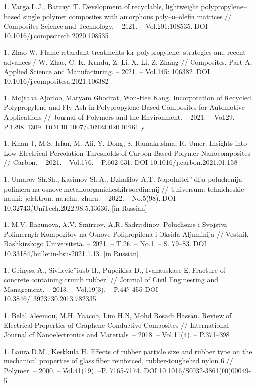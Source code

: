 1. Varga L.J., Baranyi T. Development of recyclable, lightweight
polypropylene--based single polymer composites with amorphous
poly--α--olefin matrices // Composites Science and Technology. --
2021. -- Vol.201:108535. DOI 10.1016/j.compscitech.2020.108535

1. Zhao W. Flame retardant treatments for polypropylene: strategies and
recent advances / W. Zhao, C. K. Kundu, Z. Li, X. Li, Z. Zhang //
Composites. Part A, Applied Science and Manufacturing. -- 2021. --
Vol.145: 106382. DOI 10.1016/j.compositesa.2021.106382

1. Mojtaba Ajorloo, Maryam Ghodrat, Won-Hee Kang. Incorporation of
Recycled Polypropylene and Fly Ash in Polypropylene-Based Composites
for Automotive Applications // Journal of Polymers and the
Environment. -- 2021. -- Vol.29. -- P.1298--1309. DOI
10.1007/s10924-020-01961-y

1. Khan Т, M.S. Irfan, M. Ali, Y. Dong, S. Ramakrishna, R. Umer. Insights
into Low Electrical Percolation Thresholds of Carbon-Based Polymer
Nanocomposites // Carbon. -- 2021. -- Vol.176. -- P.602-631. DOI
10.1016/j.carbon.2021.01.158

1. Umarov Sh.Sh., Kasimov Sh.A., Dzhalilov A.T.
Napolnitel''{} dlja poluchenija polimera
na osnove metalloorganicheskih soedinenij // Universum: tehnicheskie
nauki: jelektron. nauchn. zhurn. -- 2022. -- No.5(98). DOI
10.32743/UniTech.2022.98.5.13636. {[}in Russian{]}

1. M.V. Bazunova, A.V. Smirnov, A.R. Sadritdinov. Poluchenie i Svojstva
Polimernyh Kompozitov na Osnove Polipropilena i Oksida Aljuminija //
Vestnik Bashkirskogo Universiteta. -- 2021. -- T.26. -- No.1. -- S.
79--83. DOI 10.33184/bulletin-bsu-2021.1.13. {[}in Russian{]}

1. Grinysa А., Sivilevicˇiusb H., Pupeikisa D., Ivanauskasc Е. Fracture
of concrete containing crumb rubber. // Journal of Civil Engineering
and Management. -- 2013. -- Vol.19(3). -- Р.447-455 DOI
10.3846/13923730.2013.782335

1. Belal Aleemou, M.H. Yaacob, Lim H.N, Mohd Rosadi Hassan. Review of
Electrical Properties of Graphene Conductive Composites //
International Journal of Nanoelectronics and Materials. -- 2018. --
Vol.11(4). -- P.371--398

1. Laura D.M., Keskkula H. Effects of rubber particle size and rubber
type on the mechanical properties of glass fiber reinforced,
rubber-toughehed nylon 6 // Polymer. -- 2000. -- Vol.41(19). --P.
7165-7174. DOI 10.1016/S0032-3861(00)00049-5

